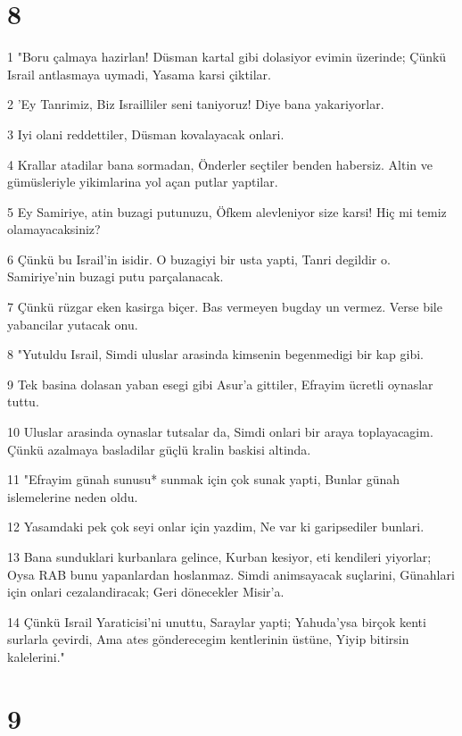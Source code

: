 \chapter{8}

\par 1 "Boru çalmaya hazirlan! Düsman kartal gibi dolasiyor evimin üzerinde; Çünkü Israil antlasmaya uymadi, Yasama karsi çiktilar.
\par 2 'Ey Tanrimiz, Biz Israilliler seni taniyoruz! Diye bana yakariyorlar.
\par 3 Iyi olani reddettiler, Düsman kovalayacak onlari.
\par 4 Krallar atadilar bana sormadan, Önderler seçtiler benden habersiz. Altin ve gümüsleriyle yikimlarina yol açan putlar yaptilar.
\par 5 Ey Samiriye, atin buzagi putunuzu, Öfkem alevleniyor size karsi! Hiç mi temiz olamayacaksiniz?
\par 6 Çünkü bu Israil'in isidir. O buzagiyi bir usta yapti, Tanri degildir o. Samiriye'nin buzagi putu parçalanacak.
\par 7 Çünkü rüzgar eken kasirga biçer. Bas vermeyen bugday un vermez. Verse bile yabancilar yutacak onu.
\par 8 "Yutuldu Israil, Simdi uluslar arasinda kimsenin begenmedigi bir kap gibi.
\par 9 Tek basina dolasan yaban esegi gibi Asur'a gittiler, Efrayim ücretli oynaslar tuttu.
\par 10 Uluslar arasinda oynaslar tutsalar da, Simdi onlari bir araya toplayacagim. Çünkü azalmaya basladilar güçlü kralin baskisi altinda.
\par 11 "Efrayim günah sunusu* sunmak için çok sunak yapti, Bunlar günah islemelerine neden oldu.
\par 12 Yasamdaki pek çok seyi onlar için yazdim, Ne var ki garipsediler bunlari.
\par 13 Bana sunduklari kurbanlara gelince, Kurban kesiyor, eti kendileri yiyorlar; Oysa RAB bunu yapanlardan hoslanmaz. Simdi animsayacak suçlarini, Günahlari için onlari cezalandiracak; Geri dönecekler Misir'a.
\par 14 Çünkü Israil Yaraticisi'ni unuttu, Saraylar yapti; Yahuda'ysa birçok kenti surlarla çevirdi, Ama ates gönderecegim kentlerinin üstüne, Yiyip bitirsin kalelerini."

\chapter{9}

